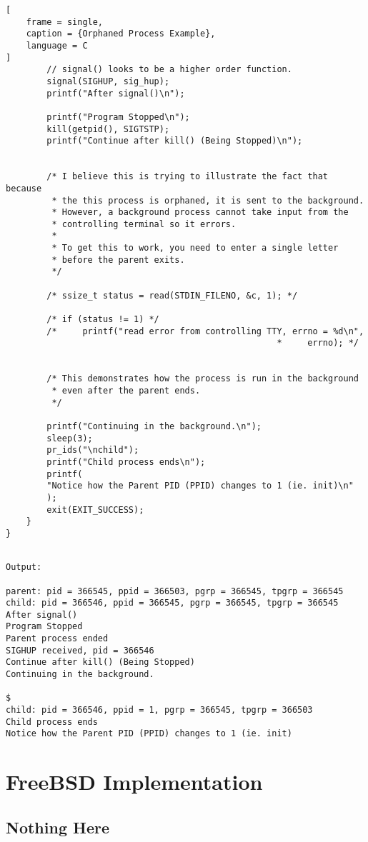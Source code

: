 \documentclass{article}
\begin{document}
\begin{lstlisting}[
    frame = single,
    caption = {Orphaned Process Example},
    language = C
]
        // signal() looks to be a higher order function.
        signal(SIGHUP, sig_hup);
        printf("After signal()\n");

        printf("Program Stopped\n");
        kill(getpid(), SIGTSTP);
        printf("Continue after kill() (Being Stopped)\n");


        /* I believe this is trying to illustrate the fact that because
         * the this process is orphaned, it is sent to the background.
         * However, a background process cannot take input from the 
         * controlling terminal so it errors.
         *
         * To get this to work, you need to enter a single letter 
         * before the parent exits.
         */

        /* ssize_t status = read(STDIN_FILENO, &c, 1); */

        /* if (status != 1) */
        /*     printf("read error from controlling TTY, errno = %d\n", 
                                                     *     errno); */


        /* This demonstrates how the process is run in the background 
         * even after the parent ends.
         */

        printf("Continuing in the background.\n");
        sleep(3);
        pr_ids("\nchild");
        printf("Child process ends\n");
        printf(
        "Notice how the Parent PID (PPID) changes to 1 (ie. init)\n"
        );
        exit(EXIT_SUCCESS);
    }
}
\end{lstlisting}
\begin{lstlisting}

Output:

parent: pid = 366545, ppid = 366503, pgrp = 366545, tpgrp = 366545
child: pid = 366546, ppid = 366545, pgrp = 366545, tpgrp = 366545
After signal()
Program Stopped
Parent process ended
SIGHUP received, pid = 366546
Continue after kill() (Being Stopped)
Continuing in the background.

$
child: pid = 366546, ppid = 1, pgrp = 366545, tpgrp = 366503
Child process ends
Notice how the Parent PID (PPID) changes to 1 (ie. init)
\end{lstlisting}
\section{FreeBSD Implementation}
\subsection{Nothing Here}
\end{document}
